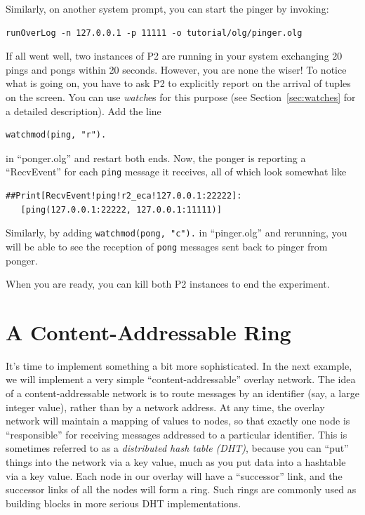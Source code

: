 \documentclass{article}
\begin{document}
Similarly, on another system prompt, you can start the pinger by
invoking:
\begin{verbatim}
runOverLog -n 127.0.0.1 -p 11111 -o tutorial/olg/pinger.olg 
\end{verbatim}

If all went well, two instances of P2 are running in your system
exchanging 20 pings and pongs within 20 seconds. However, you are none
the wiser!  To notice what is going on, you have to ask P2 to explicitly
report on the arrival of tuples on the screen.  You can use
\emph{watch}es for this purpose (see Section~\ref{sec:watches} for
a detailed description).  Add the line
\begin{lstlisting}
watchmod(ping, "r").
\end{lstlisting}
in ``ponger.olg'' and restart both ends.  Now, the ponger is reporting a
``RecvEvent'' for each \lstinline$ping$ message it receives, all of
which look somewhat like
\begin{verbatim}
##Print[RecvEvent!ping!r2_eca!127.0.0.1:22222]:
   [ping(127.0.0.1:22222, 127.0.0.1:11111)]
\end{verbatim}

Similarly, by adding \lstinline$watchmod(pong, "c").$ in ``pinger.olg''
and rerunning, you will be able to see the reception of \lstinline$pong$
messages sent back to pinger from ponger.

When you are ready, you can kill both P2 instances to end the
experiment.





\section{A Content-Addressable Ring}

It's time to implement something a bit more sophisticated.  In the next
example, we will implement a very simple ``content-addressable'' overlay
network.  The idea of a content-addressable network is to route messages
by an identifier (say, a large integer value), rather than by a network
address.  At any time, the overlay network will maintain a mapping of
values to nodes, so that exactly one node is ``responsible'' for
receiving messages addressed to a particular identifier.  This is
sometimes referred to as a {\em distributed hash table (DHT)}, because
you can ``put'' things into the network via a key value, much as you put
data into a hashtable via a key value.  Each node in our overlay will
have a ``successor'' link, and the successor links of all the nodes will
form a ring.  Such rings are commonly used as building blocks in more
serious DHT implementations.
\end{document}
